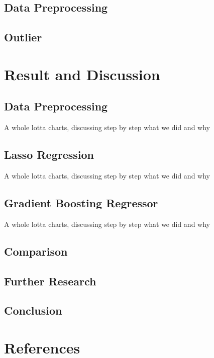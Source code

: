 \documentclass{article}
\begin{document}
\subsection{Data Preprocessing}
\subsection{Outlier}
\section{Result and Discussion}
\subsection{Data Preprocessing}
A whole lotta charts, discussing step by step what we did and why
\subsection{Lasso Regression}
A whole lotta charts, discussing step by step what we did and why
\subsection{Gradient Boosting Regressor}
A whole lotta charts, discussing step by step what we did and why
\subsection{Comparison}
\subsection{Further Research}
\subsection{Conclusion}

\section{References}
\end{document}
